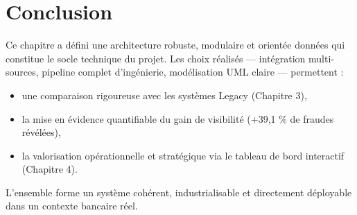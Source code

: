 \section{Conclusion}
Ce chapitre a défini une architecture robuste, modulaire et orientée données qui constitue le socle technique du projet.  
Les choix réalisés — intégration multi-sources, pipeline complet d’ingénierie, modélisation UML claire — permettent :
\begin{itemize}
    \item une comparaison rigoureuse avec les systèmes Legacy (Chapitre 3),
    \item la mise en évidence quantifiable du gain de visibilité (+39,1 \% de fraudes révélées),
    \item la valorisation opérationnelle et stratégique via le tableau de bord interactif (Chapitre 4).
\end{itemize}

L’ensemble forme un système cohérent, industrialisable et directement déployable dans un contexte bancaire réel.